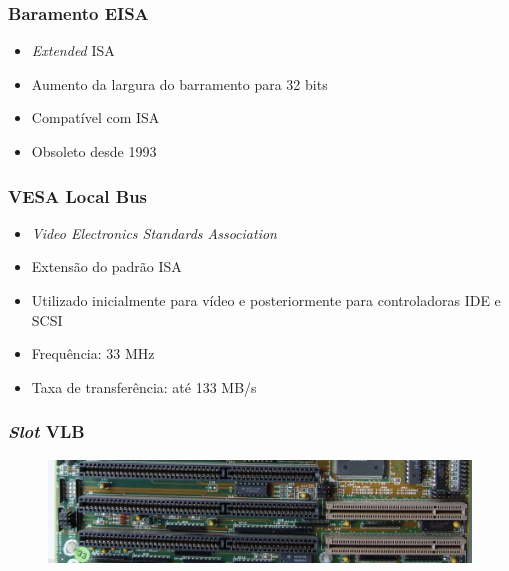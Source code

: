 \documentclass[aspectratio=169,
				xcolor=table]{beamer}
\begin{document}
	\begin{frame}
		\frametitle{Baramento EISA}
		\begin{itemize}
			\item \textit{Extended} ISA
			\vspace{.7em}
			\item Aumento da largura do barramento para 32 bits
			\vspace{.7em}
			\item Compatível com ISA
			\vspace{1em}
			\item Obsoleto desde 1993	
			
		\end{itemize}
	\end{frame}
	
	\begin{frame}
		\frametitle{VESA Local Bus}
		\begin{itemize}
			\item  \textit{Video Electronics Standards Association}
			\vspace{1em}
			\item Extensão do padrão ISA   
			\vspace{1em}
			\item Utilizado inicialmente para vídeo e posteriormente para controladoras IDE e SCSI
			\vspace{1em}
			\item Frequência: 33 MHz 
			\vspace{1em}
			\item Taxa de transferência: até 133 MB/s
		\end{itemize}
	\end{frame}
	
	\begin{frame}
		\frametitle{\textit{Slot} VLB}
		\begin{figure}[hbtp]
		\centering
		\includegraphics[width=.95\textwidth]{../figs/cap11/vlb.jpg}
		\end{figure}
	\end{frame}	
	
\end{document}
